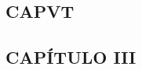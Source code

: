 \message{ !name(tractatus.tex)}\documentclass{article}
\begin{document}

\begin{paracol}{2} %
  \begin{nthcolumn*}{0} %
    \subsection*{\centering CAPVT }
    \subsection*{\centering } 
  \end{nthcolumn*}
  \vspace{0.5cm}
  \begin{nthcolumn}{1} %
    \subsection*{\centering CAPÍTULO III}

\end{nthcolumn}
\end{paracol}
\end{document}
